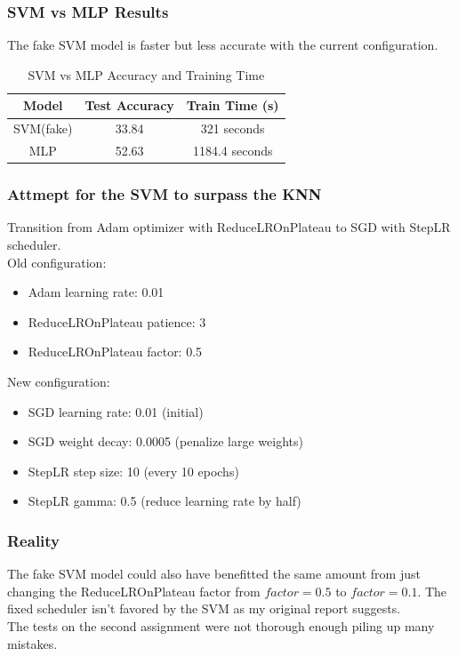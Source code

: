 \begin{frame}
    \frametitle{SVM vs MLP Results}
    The fake SVM model is faster but less accurate with the current configuration.
    \begin{table}[H]
        \centering
        \begin{tabular}{|c|c|c|}
            \hline
            \textbf{Model} & \textbf{Test Accuracy} & \textbf{Train Time (s)} \\ \hline %
            SVM(fake)      & 33.84                  & 321 seconds             \\ \hline
            MLP            & 52.63                  & 1184.4 seconds          \\ \hline
        \end{tabular}
        \caption{SVM vs MLP Accuracy and Training Time}
    \end{table}
\end{frame}

\begin{frame}
    \frametitle{Attmept for the SVM to surpass the KNN}
    Transition from Adam optimizer with ReduceLROnPlateau to SGD with StepLR scheduler.\\
    Old configuration:
    \begin{itemize}
        \item Adam learning rate: 0.01
        \item ReduceLROnPlateau patience: 3
        \item ReduceLROnPlateau factor: 0.5
    \end{itemize}
    New configuration:
    \begin{itemize}
        \item SGD learning rate: 0.01 (initial)
        \item SGD weight decay: 0.0005 (penalize large weights)
        \item StepLR step size: 10 (every 10 epochs)
        \item StepLR gamma: 0.5 (reduce learning rate by half)
    \end{itemize}
\end{frame}

\begin{frame}
    \frametitle{Reality}
    The fake SVM model could also have benefitted the same amount from just 
    changing the ReduceLROnPlateau factor from $factor = 0.5$ to $factor = 0.1$.
    The fixed scheduler isn't favored by the SVM as my original report suggests.\\
    \vspace{1cm}
    The tests on the second assignment were not thorough enough piling up many mistakes.
\end{frame}

